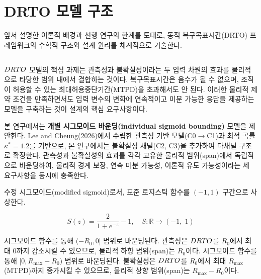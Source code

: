 \section{DRTO 모델 구조}
\label{sec:drto-model}

앞서 설명한 이론적 배경과 선행 연구의 한계를 토대로, 동적
복구목표시간(DRTO) 프레임워크의 수학적 구조와 설계 원리를 체계적으로 기술한다.

\subsection{}
\label{subsec:core-equation}

$DRTO$ 모델의 핵심 과제는 관측성과 불확실성이라는 두 입력 차원의 효과를
물리적으로 타당한 범위 내에서 결합하는 것이다. 복구목표시간은 음수가 될 수 없으며,
조직이 허용할 수 있는 최대허용중단기간(MTPD)을 초과해서도 안 된다.
이러한 물리적 제약 조건을 만족하면서도 입력 변수의 변화에 연속적이고
미분 가능한 응답을 제공하는 모델을 구축하는 것이 설계의 핵심 요구사항이다.

본 연구에서는 \textbf{개별 시그모이드 바운딩(individual sigmoid bounding)} 모델을 제안한다.
Lee and Cheung(2026)에서 수립한 관측성 기반 모델(C0$\to$C1)과
최적 곡률 $\kappa^{*} = 1.2$를 기반으로,
본 연구에서는 불확실성 채널(C2, C3)을 추가하여 다채널 구조로 확장한다.
관측성과 불확실성의 효과를 각각 고유한 물리적 범위(span)에서
독립적으로 바운딩하여, 물리적 경계 보장, 연속 미분 가능성,
이론적 유도 가능성이라는 세 요구사항을 동시에 충족한다.

 수정 시그모이드(modified sigmoid)로서, 
표준 로지스틱 함수를 $(-1, 1)$ 구간으로 사상한다.

\begin{equation}
  S(z) = \frac{2}{1 + e^{-z}} - 1, \quad S: \mathbb{R} \to (-1,\; 1)
  \label{eq:sigmoid}
\end{equation}

 시그모이드 함수를 통해 $(-R_0, 0]$ 범위로 바운딩된다.
관측성은 $DRTO$를 $R_0$에서 최대 $0$까지 감소시킬 수 있으므로,
물리적 하향 범위(span)는 $R_0$이다.
 시그모이드 함수를 통해 $[0, R_{\max} - R_0)$ 범위로 바운딩된다\chg{. $0$은
달성 가능하나 $R_{\max} - R_0$에는 도달하지 못하며, $R_0 = 6.0$h와 $R_{\max} = 24.0$h를
가정하면 그 범위는 $[0, 18.0)$h이다}.
불확실성은 $DRTO$를 $R_0$에서 최대 $R_{\max}$(MTPD)까지 증가시킬 수 있으므로,
물리적 상향 범위(span)는 $R_{\max} - R_0$이다.

